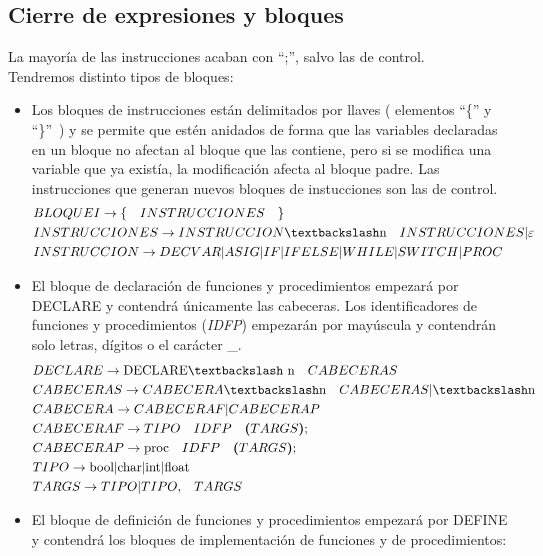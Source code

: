\documentclass[a4paper, 12pt]{article}
\begin{document}
\subsection{Cierre de expresiones y bloques}
La mayoría de las instrucciones acaban con ``;'', salvo las de control.\\
Tendremos distinto tipos de bloques:
\begin{itemize}
\item Los bloques de instrucciones están delimitados por llaves ( elementos ``\{'' y ``\}''\ ) y se permite que estén anidados de forma que las variables declaradas en un bloque no afectan al bloque que las contiene, pero si se modifica una variable que ya existía, la modificación afecta al bloque padre. Las instrucciones que generan nuevos bloques de instucciones son las de control.
\begin{align*}
&BLOQUEI \rightarrow \textrm{\{}\quad INSTRUCCIONES \quad \textrm{\}}\\
&INSTRUCCIONES \rightarrow INSTRUCCION \textbackslash \textrm{n} \quad INSTRUCCIONES|  \varepsilon\\
&INSTRUCCION \rightarrow DECVAR | ASIG | IF| IFELSE | WHILE | SWITCH | PROC
\end{align*}
\item El bloque de declaración de funciones y procedimientos empezará por DECLARE y contendrá únicamente las cabeceras. Los identificadores de funciones y procedimientos (\textit{IDFP}) empezarán por mayúscula y contendrán solo letras, dígitos o el carácter \_.
\begin{align*}
&DECLARE \rightarrow \textrm{DECLARE\textbackslash \textrm{n}}\quad CABECERAS\\
&CABECERAS \rightarrow CABECERA \textbackslash \textrm{n} \quad CABECERAS|  \textbackslash \textrm{n}\\
&CABECERA \rightarrow CABECERAF  |CABECERAP \\
&CABECERAF \rightarrow TIPO\quad IDFP\quad  \textbf{(} TARGS \textbf{)}\textrm{;}\\
&CABECERAP \rightarrow \textrm{proc}\quad IDFP\quad  \textbf{(} TARGS \textbf{)}\textrm{;} \\
&TIPO \rightarrow  \textrm{bool}|\textrm{char}|\textrm{int}|\textrm{float}\\
&TARGS \rightarrow TIPO|  TIPO \textrm{,} \quad TARGS
\end{align*}
\item El bloque de definición de funciones y procedimientos empezará por DEFINE y contendrá los bloques de implementación de funciones y de procedimientos:

\end{itemize}
\end{document}
